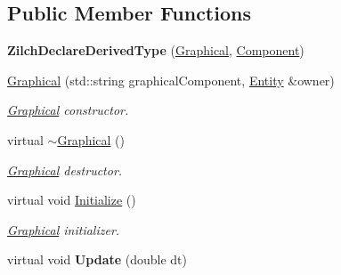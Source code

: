 \subsection*{Public Member Functions}
\begin{DoxyCompactItemize}
\item 
\hypertarget{classDCEngine_1_1Components_1_1Graphical_a026c7c1b11b188755984be14b7b84da6}{{\bfseries Zilch\-Declare\-Derived\-Type} (\hyperlink{classDCEngine_1_1Components_1_1Graphical}{Graphical}, \hyperlink{classDCEngine_1_1Component}{Component})}\label{classDCEngine_1_1Components_1_1Graphical_a026c7c1b11b188755984be14b7b84da6}

\item 
\hyperlink{classDCEngine_1_1Components_1_1Graphical_ac2840dc004a9beac1ec9f68900371bdd}{Graphical} (std\-::string graphical\-Component, \hyperlink{classDCEngine_1_1Entity}{Entity} \&owner)
\begin{DoxyCompactList}\small\item\em \hyperlink{classDCEngine_1_1Components_1_1Graphical}{Graphical} constructor. \end{DoxyCompactList}\item 
\hypertarget{classDCEngine_1_1Components_1_1Graphical_a5d2c3c5274e0e8fb3ae13ce3290f4ae6}{virtual \hyperlink{classDCEngine_1_1Components_1_1Graphical_a5d2c3c5274e0e8fb3ae13ce3290f4ae6}{$\sim$\-Graphical} ()}\label{classDCEngine_1_1Components_1_1Graphical_a5d2c3c5274e0e8fb3ae13ce3290f4ae6}

\begin{DoxyCompactList}\small\item\em \hyperlink{classDCEngine_1_1Components_1_1Graphical}{Graphical} destructor. \end{DoxyCompactList}\item 
\hypertarget{classDCEngine_1_1Components_1_1Graphical_aacb128f93226ca975acde29d9b2741ba}{virtual void \hyperlink{classDCEngine_1_1Components_1_1Graphical_aacb128f93226ca975acde29d9b2741ba}{Initialize} ()}\label{classDCEngine_1_1Components_1_1Graphical_aacb128f93226ca975acde29d9b2741ba}

\begin{DoxyCompactList}\small\item\em \hyperlink{classDCEngine_1_1Components_1_1Graphical}{Graphical} initializer. \end{DoxyCompactList}\item 
\hypertarget{classDCEngine_1_1Components_1_1Graphical_addb2442472fc35fd5d2117f3f86f6e76}{virtual void {\bfseries Update} (double dt)}\label{classDCEngine_1_1Components_1_1Graphical_addb2442472fc35fd5d2117f3f86f6e76}


\end{DoxyCompactItemize}
